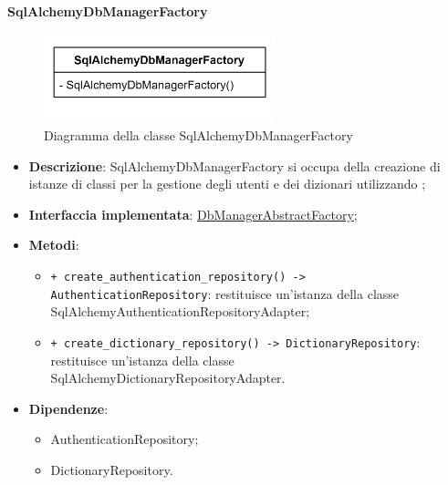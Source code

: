 \paragraph{SqlAlchemyDbManagerFactory} \label{SqlAlchemyDbManagerFactory}
\begin{figure}[H]
    \centering
    \includegraphics[width=0.6\textwidth]{assets/Backend/sql_alchemy_db_manager_factory.png}
    \caption{Diagramma della classe SqlAlchemyDbManagerFactory}
  \end{figure}
\begin{itemize}
    \item \textbf{Descrizione}: SqlAlchemyDbManagerFactory si occupa della creazione di istanze di classi per la gestione degli utenti e dei dizionari utilizzando ;
    \item \textbf{Interfaccia implementata}: \hyperref[DbManagerAbstractFactory]{DbManagerAbstractFactory};
    \item \textbf{Metodi}:
    \begin{itemize}
        \item \texttt{+ create\_authentication\_repository() -> AuthenticationRepository}: restituisce un'istanza della classe SqlAlchemyAuthenticationRepositoryAdapter;
        \item \texttt{+ create\_dictionary\_repository() -> DictionaryRepository}: restituisce un'istanza della classe SqlAlchemyDictionaryRepositoryAdapter.
    \end{itemize}
    \item \textbf{Dipendenze}:
    \begin{itemize}
        \item AuthenticationRepository;
        \item DictionaryRepository.
    \end{itemize}
\end{itemize}

